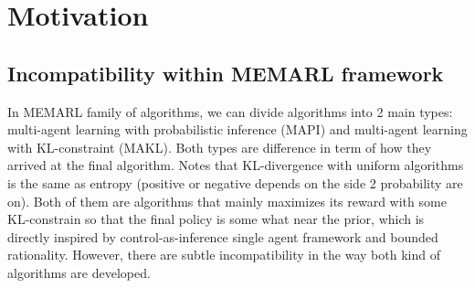 \section{Motivation}

\subsection{Incompatibility within MEMARL framework}

In MEMARL family of algorithms, we can divide algorithms into 2 main types: multi-agent learning with probabilistic inference (MAPI) and multi-agent learning with KL-constraint (MAKL). Both types are difference in term of how they arrived at the final algorithm. Notes that KL-divergence with uniform algorithms is the same as entropy (positive or negative depends on the side 2 probability are on). Both of them are algorithms that mainly maximizes its reward with some KL-constrain so that the final policy is some what near the prior, which is directly inspired by control-as-inference single agent framework and bounded rationality. However, there are subtle incompatibility in the way both kind of algorithms are developed. 

